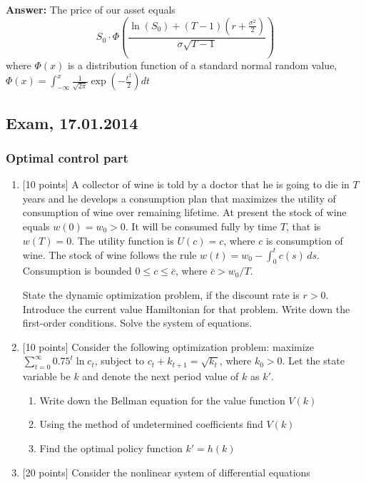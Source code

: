 \documentclass[12pt, a4paper]{article}
\newcommand{\dt}{dt}
\begin{document}
\textbf{Answer:} The price of our asset equals
\[
S_{0}\cdot\Phi\left(\frac{ \ln(S_{0}) + (T-1)\left(r + \frac{ \sigma^{2}}{ 2}\right)}{ \sigma\sqrt{T-1}}\right)
\]
where $\Phi(x)$ is a distribution function of  a standard normal random value, $\Phi(x) = \int_{-\infty}^{x}\frac{ 1}{ \sqrt{2\pi}}\exp\left(-\frac{ t^{2}}{ 2}\right)\dt$


\subsection{Exam, 17.01.2014}

\subsubsection*{Optimal control part}

\begin{enumerate}
\item $[$10 points] A collector of wine is told by a doctor that he is going to die in $T$ years and he develops a consumption plan that maximizes the utility of consumption of wine over remaining lifetime. At present the stock of wine equals $w(0)=w_0>0$. It will be consumed fully by time $T$, that is $w(T)=0$. The utility function is $U(c)=c$, where $c$ is consumption of wine. The stock of wine follows the rule $w(t)=w_0-\int_0^t c(s) \, ds$. Consumption is bounded $0\leq c \leq \bar{c}$, where $\bar{c}>w_0/T$.

State the dynamic optimization problem, if the discount rate is $r>0$. Introduce the current value Hamiltonian for that problem. Write down the first-order conditions. Solve the system of equations.

\item $[$10 points] Consider the following optimization problem: maximize $\sum_{t=0}^{\infty} 0.75^t \ln c_t$, subject to $c_t+k_{t+1}=\sqrt{k_t}$, where $k_0>0$. Let the state variable be $k$ and denote the next period value of $k$ as $k'$.

\begin{enumerate}
\item Write down the Bellman equation for the value function $V(k)$
\item Using the method of undetermined coefficients find $V(k)$
\item Find the optimal policy function $k'=h(k)$
\end{enumerate}

\item $[$20 points] Consider the nonlinear system of differential equations


\end{enumerate}
\end{document}
